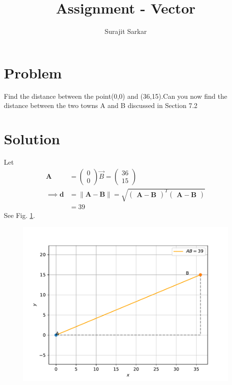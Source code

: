 \documentclass[journal,12pt,twocolumn]{IEEEtran}
\title{\mytitle}
\title{
Assignment - Vector
}
\author{Surajit Sarkar}
\newcommand{\myvec}[1]{\ensuremath{\begin{pmatrix}#1\end{pmatrix}}}
\providecommand{\norm}[1]{\lVert#1\rVert}
\let\vec\mathbf
\begin{document}
\maketitle
\tableofcontents
\bigskip
\section{\textbf{Problem}}
Find the distance between the point(0,0) and (36,15).Can you now find the distance between the two towns A and B discussed in Section 7.2
\section{\textbf{Solution}}
\fi
Let
\begin{align}
\vec{A}&=\myvec{0 \\ 0}  
\Vec{B}=\myvec{36 \\ 15} \\ 
\implies 
\vec{d}&=\norm{\vec{A}-\vec{B}}=\sqrt{\myvec{\vec{A}-\vec{B}}^T\myvec{\vec{A}-\vec{B}}} \\
&=39
\end{align}
See Fig. 
\ref{fig:10/7/1/2vec}.
\begin{figure}[!h]
\centering
\includegraphics[width=\columnwidth]{chapters/10/7/1/2/figs/vec.pdf}
\caption{}
\label{fig:10/7/1/2vec}
\end{figure}
\end{document}
